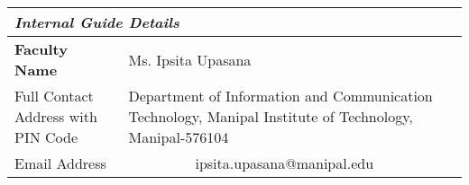 \begin{table}
\begin{scriptsize}
\begin{tabularx}{\textwidth}{|X|X|X|X|}
\multicolumn{4}{l}{\textit{Internal Guide Details}}\\ \hline
\textbf{Faculty Name}&\multicolumn{2}{X}{Ms. Ipsita Upasana} &\\ \hline
Full Contact Address with PIN Code&\multicolumn{2}{p{6cm}}{Department of Information and Communication Technology,  Manipal Institute of Technology, Manipal-576104}& \\ \hline
Email Address&\multicolumn{2}{c}{ipsita.upasana@manipal.edu}&\\  \hline
\end{tabularx}
\end{scriptsize}
\end{table}
